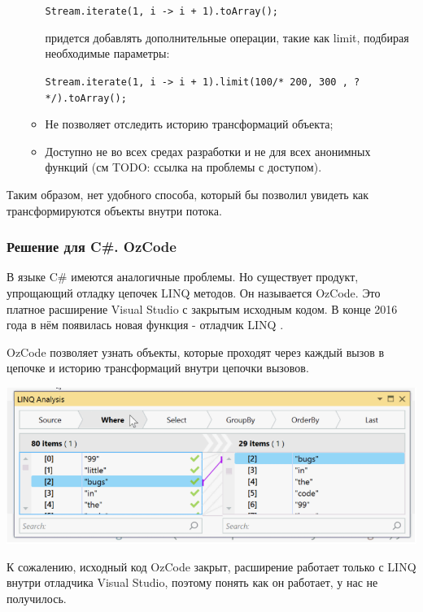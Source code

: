 \begin{itemize}
\begin{itemize}
		\texttt{Stream.iterate(1, i -> i + 1).toArray();}
		
		придется добавлять дополнительные операции, такие как limit, подбирая необходимые параметры:
		
		\texttt{Stream.iterate(1, i -> i + 1).limit(100/* 200, 300 , ? */).toArray();}
		\item Не позволяет отследить историю трансформаций объекта;
		\item Доступно не во всех средах разработки и не для всех анонимных функций (см TODO: ссылка на проблемы с доступом).
	\end{itemize}
\end{itemize}

Таким образом, нет удобного способа, который бы позволил увидеть как трансформируются объекты внутри потока.

\subsubsection{Решение для C\#. OzCode}
В языке C\# имеются аналогичные проблемы. Но существует продукт, упрощающий отладку цепочек LINQ методов. Он называется OzCode. Это платное расширение Visual Studio \cite{ms:vs} с закрытым исходным кодом. В конце 2016 года в нём появилась новая функция - отладчик LINQ \cite{ms:ozcode}.

OzCode позволяет узнать объекты, которые проходят через каждый вызов в цепочке и историю трансформаций внутри цепочки вызовов.

\includegraphics[scale=0.6]{chapter1/img/linq.png}

К сожалению, исходный код OzCode закрыт, расширение работает только с LINQ внутри отладчика Visual Studio, поэтому понять как он работает, у нас не получилось. 
